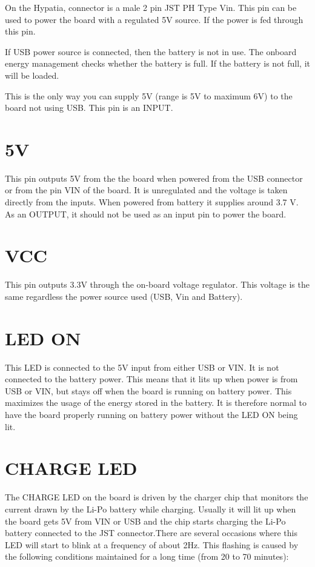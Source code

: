 On the Hypatia, connector is a male 2 pin JST PH Type  Vin. This pin can be
used to power the board with a regulated 5V source. If the power is fed through this pin.

If  USB power source is connected, then the battery is not in use. The onboard energy management  checks whether the battery is full. If the battery is not full, it will be loaded.

 This is the only way you can supply 5V (range is 5V to maximum 6V) to the board not using USB.
  This pin is an INPUT. 
  
\section{5V}

This pin outputs 5V from the the board when powered from the USB connector or from the  pin VIN of the board. It is unregulated and the voltage is taken directly from the inputs. When powered from battery it supplies around 3.7 V. As an OUTPUT, it should not be used as an input pin to power the board.

\section{VCC}

This pin outputs 3.3V through the on-board voltage regulator. This voltage is the same regardless the power
source used (USB, Vin and Battery).

\section{LED ON}

This LED is connected to the 5V input from either USB or VIN. It is not connected to the battery power. This means that it lits up when power is from USB or VIN, but stays off when the board is running on battery power. This maximizes the usage of the energy stored in the battery. It is therefore normal to have the board properly running on battery power without the LED ON being lit.

\section{CHARGE LED}

The CHARGE LED on the board is driven by the charger chip that monitors the current drawn by the Li-Po battery while charging. Usually it will lit up when the board gets 5V from VIN or USB and the chip starts charging the Li-Po battery connected to the JST connector.There are several occasions where this LED will start to blink at a frequency of about 2Hz. This flashing is caused by the following conditions maintained for a long time (from 20 to 70 minutes):

